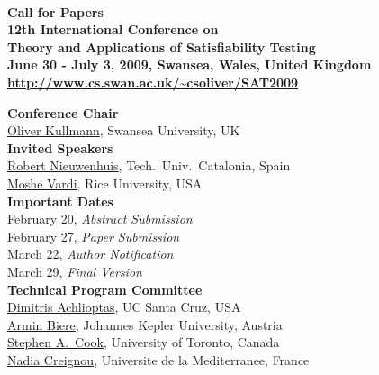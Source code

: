 \documentclass[10pt]{article}
\newcommand{\bthlight}[1]{{\color[rgb]{0.2,0.2,0.5}#1}}
\newcommand{\bhlight}[1]{{\color[rgb]{0.2,0.2,0.6}#1}}
\begin{document}
\pagestyle{empty}

\begin{center}
  {\bf
    \bthlight{{\huge SAT 2009}} \\[0.3cm]
    {\Large Call for Papers} \\[0.15cm]
    \bthlight{
      {\LARGE 12th International Conference on} \\[0.2cm]
      {\LARGE Theory and Applications of Satisfiability Testing} \\[0.15cm]
      {\Large June 30 - July 3, 2009, Swansea, Wales, United Kingdom}
    } \\[0.15cm]
    {\large \url{http://www.cs.swan.ac.uk/~csoliver/SAT2009}}
  }
\end{center}

\vspace*{-0.1cm}
%
\begin{minipage}[t]{7.5cm}
{\large {\bf \bhlight{Conference Chair}}} \\[0.05cm]
{\small
  \href{http://www.cs.swan.ac.uk/~csoliver/index.html}{Oliver Kullmann}, Swansea University, UK\\[0.3cm]
}
{\large {\bf \bhlight{Invited Speakers}}} \\%
{\small
  \href{http://www.lsi.upc.edu/~roberto/}{Robert Nieuwenhuis}, Tech.~Univ.~Catalonia, Spain\\
  \href{http://www.cs.rice.edu/~vardi/}{Moshe Vardi}, Rice University, USA\\[0.3cm]
}
{\large {\bf \bhlight{Important Dates}}} \\[0.05cm]
{\small
  February 20, {\em Abstract Submission} \\
  February 27, {\em Paper Submission} \\
  March 22, {\em Author Notification} \\
  March 29, {\em Final Version} \\[0.3cm]
}
{\large {\bf \bhlight{Technical Program Committee}}} \\[0.01cm]
{\footnotesize
          \href{http://www.cs.ucsc.edu/~optas/}{Dimitris Achlioptas}, UC Santa Cruz, USA \\
          \href{http://fmv.jku.at/biere/}{Armin Biere}, Johannes Kepler University, Austria  \\
          \href{http://www.cs.toronto.edu/~sacook/}{Stephen A.\ Cook}, University of Toronto, Canada \\
          \href{http://www.dil.univ-mrs.fr/membres.html}{Nadia Creignou}, Universite de la Mediterranee, France  \\
}
\end{minipage}
\end{document}
